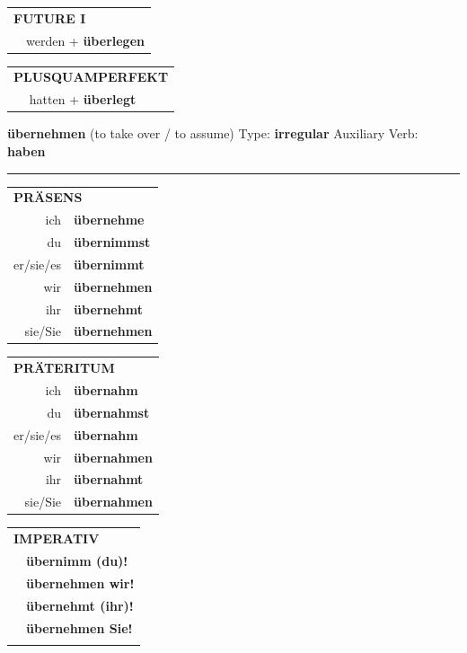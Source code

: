 \documentclass[10pt,a4paper]{revtex4-2}
\begin{document}
\begin{verbbox-acc}
\begin{tabular}{rl}
    \multicolumn{2}{l}{\textbf{FUTURE I} }\\
  &  werden + \textbf{überlegen}\\
 
  \end{tabular}
\hfill
   \begin{tabular}{rl}
      \multicolumn{2}{l}{\textbf{PLUSQUAMPERFEKT}}\\
  &  hatten + \textbf{überlegt}\\
  \end{tabular}
  
  \vspace{-5pt}


\end{verbbox-acc}

\begin{verbbox}
    {\Large \bf übernehmen} (to take over / to assume) \hfill Type: \textbf{irregular} \hfill Auxiliary Verb: \textbf{haben} 
    
     \vspace{5pt}

    \hrule
    
    \vspace{5pt}

  \begin{tabular}{rl}
     \multicolumn{2}{l}{\textbf{PRÄSENS} }\\
    ich & \textbf{übernehme}\\
    du & \textbf{übernimmst}\\
    er/sie/es & \textbf{übernimmt}\\
    wir & \textbf{übernehmen}\\
    ihr & \textbf{übernehmt}\\
    sie/Sie & \textbf{übernehmen}\\
  \end{tabular}
  \hfill
     \begin{tabular}{rl}
    \multicolumn{2}{l}{\textbf{PRÄTERITUM} }\\
    ich & \textbf{übernahm}\\
    du & \textbf{übernahmst}\\
    er/sie/es & \textbf{übernahm}\\
    wir & \textbf{übernahmen}\\
    ihr & \textbf{übernahmt}\\
    sie/Sie & \textbf{übernahmen}\\
  \end{tabular}
  \hfill
  \begin{tabular}{rl}
     \multicolumn{2}{l}{\textbf{IMPERATIV} }\\
   & \textbf{übernimm (du)!}\\
   & \textbf{übernehmen wir!}\\
   & \textbf{übernehmt (ihr)!}\\
   & \textbf{übernehmen Sie!}\\
   & \vspace{10pt}
  \end{tabular}


\end{verbbox}
\end{document}
